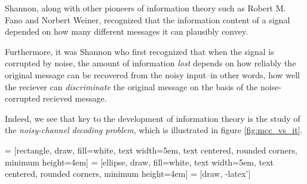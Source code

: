 Shannon, along
with other pioneers of information theory such as Robert M. Fano and
Norbert Weiner, recognized that the information content of a signal
depended on how many different messages it can plausibly convey.



Furthermore, it was Shannon who first recognized that when the signal
is corrupted by noise, the amount of information \emph{lost} depends
on how reliably the original message can be recovered from the noisy
input--in other words, how well the reciever can \emph{discriminate}
the original message on the basis of the noise-corrupted recieved
message.  %

Indeed, we see that key to the development of information theory is
the study of the \emph{noisy-channel decoding problem}, which is
illustrated in figure \ref{fig:mcc_vs_it}.  %

 = [rectangle, draw, fill=white, 
    text width=5em, text centered, rounded corners, minimum height=4em]
 = [ellipse, draw, fill=white, 
    text width=5em, text centered, rounded corners, minimum height=4em]
 = [draw, -latex']
    
